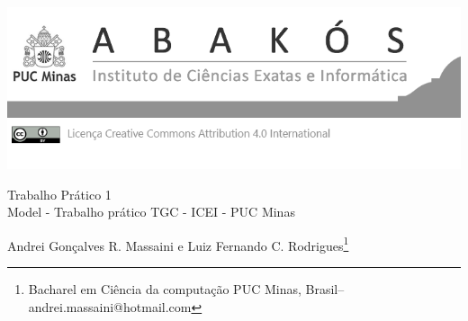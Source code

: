 \documentclass[a4paper,12pt,Times]{article}
\makeatletter
\newcommand{\monog}{Trabalho Prático 1}
\newcommand{\monogES}{Model - Trabalho prático TGC - ICEI - PUC Minas}
\newcommand{\origem}{Brasil}
\newcommand{\AutorA}{Andrei Gonçalves R. Massaini e Luiz Fernando C. Rodrigues}
\newcommand{\funcaoA}{}
\newcommand{\emailA}{andrei.massaini@hotmail.com}
\newcommand{\cursA}{Bacharel em Ciência da computação PUC Minas}
\newcommand{\AutorB}{Luiz Fernando}
\newcommand{\funcaoB}{Bacharel em Sistemas de Informação}
\newcommand{\emailB}{luizfernandotjk@gmail.com}
\newcommand{\cursB}{Instituto de Ciências Exatas e de Informática da PUC Minas}
\makeatother
\begin{document}

\begin{flushleft}

\begin{minipage} [c][5cm][b]{16.5cm} %
\includegraphics[scale=1.1]{figuras/pucmg.png} 
\end{minipage}

 \vspace{0cm} {
 \singlespacing \Large{\monog {} \\ }
  \normalsize{\monogES}
 }
\end{flushleft}
\begin{flushright}
\singlespacing 
\normalsize{\AutorA \footnote{\funcaoA \cursA, \origem -- \emailA }} \\
\end{flushright}
\thispagestyle{empty}
\end{document}
